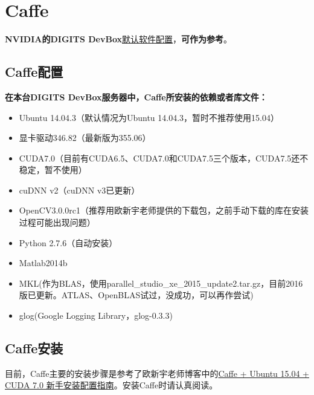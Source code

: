 \section{Caffe}
\textbf{NVIDIA的DIGITS DevBox}\href{http://docs.nvidia.com/deeplearning/digits-devbox-sw-release-notes/index.html#axzz3k5SLx3Q7}{默认软件配置}，\textbf{可作为参考}。
\subsection{Caffe配置}
\textbf{在本台DIGITS DevBox服务器中，Caffe所安装的依赖或者库文件：}
\begin{itemize}
\item Ubuntu 14.04.3（默认情况为Ubuntu 14.04.3，暂时不推荐使用15.04）
\item 显卡驱动346.82（最新版为355.06）
\item CUDA7.0（目前有CUDA6.5、CUDA7.0和CUDA7.5三个版本，CUDA7.5还不稳定，暂不使用）
\item cuDNN v2（cuDNN v3已更新）
\item OpenCV3.0.0rc1（推荐用欧新宇老师提供的下载包，之前手动下载的库在安装过程可能出现问题）
\item Python 2.7.6（自动安装）
\item Matlab2014b
\item MKL(作为BLAS，使用parallel\_studio\_xe\_2015\_update2.tar.gz，目前2016版已更新。ATLAS、OpenBLAS试过，没成功，可以再作尝试)
\item glog(Google Logging Library，glog-0.3.3)
\end{itemize}


\subsection{Caffe安装}
目前，Caffe主要的安装步骤是参考了欧新宇老师博客中的\href{http://ouxinyu.github.io/Blogs/20140723001.html}{Caffe + Ubuntu 15.04 + CUDA 7.0 新手安装配置指南}。安装Caffe时请认真阅读。

